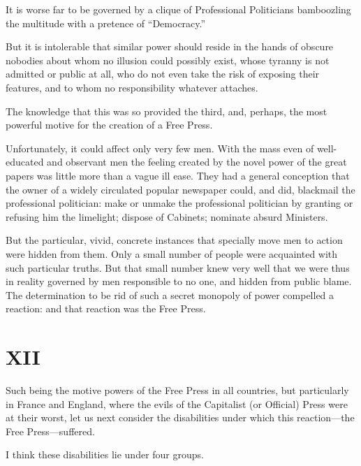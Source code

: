 \documentclass{book}
\begin{document}
It is worse far to be governed by a clique of Professional Politicians bamboozling the multitude with a pretence of “Democracy.”

But it is intolerable that similar power should reside in the hands of obscure nobodies about whom no illusion could possibly exist, whose tyranny is not admitted or public at all, who do not even take the risk of exposing their features, and to whom no responsibility whatever attaches.

The knowledge that this was so provided the third, and, perhaps, the most powerful motive for the creation of a Free Press.

Unfortunately, it could affect only very few men. With the mass even of well-educated and observant men the feeling created by the novel power of the great papers was little more than a vague ill ease. They had a general conception that the owner of a widely circulated popular newspaper could, and did, blackmail the professional politician: make or unmake the professional politician by granting or refusing him the limelight; dispose of Cabinets; nominate absurd Ministers.

But the particular, vivid, concrete instances that specially move men to action were hidden from them. Only a small number of people were acquainted with such particular truths. But that small number knew very well that we were thus in reality governed by men responsible to no one, and hidden from public blame. The determination to be rid of such a secret monopoly of power compelled a reaction: and that reaction was the Free Press.

\chapter*{XII}
\label{chapter-13}
Such being the motive powers of the Free Press in all countries, but particularly in France and England, where the evils of the Capitalist (or Official) Press were at their worst, let us next consider the disabilities under which this reaction—the Free Press—suffered.

I think these disabilities lie under four groups.
\end{document}
